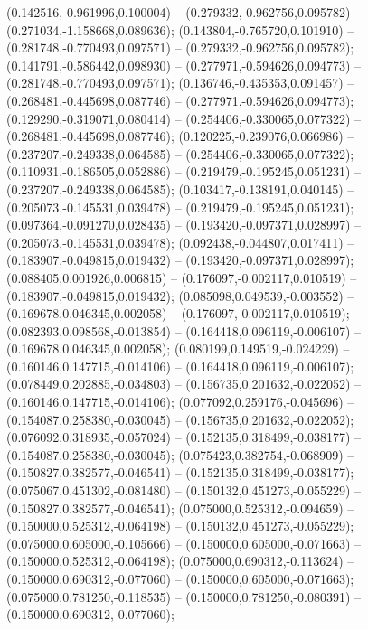  (0.142516,-0.961996,0.100004) -- (0.279332,-0.962756,0.095782) -- (0.271034,-1.158668,0.089636);
 (0.143804,-0.765720,0.101910) -- (0.281748,-0.770493,0.097571) -- (0.279332,-0.962756,0.095782);
 (0.141791,-0.586442,0.098930) -- (0.277971,-0.594626,0.094773) -- (0.281748,-0.770493,0.097571);
 (0.136746,-0.435353,0.091457) -- (0.268481,-0.445698,0.087746) -- (0.277971,-0.594626,0.094773);
 (0.129290,-0.319071,0.080414) -- (0.254406,-0.330065,0.077322) -- (0.268481,-0.445698,0.087746);
 (0.120225,-0.239076,0.066986) -- (0.237207,-0.249338,0.064585) -- (0.254406,-0.330065,0.077322);
 (0.110931,-0.186505,0.052886) -- (0.219479,-0.195245,0.051231) -- (0.237207,-0.249338,0.064585);
 (0.103417,-0.138191,0.040145) -- (0.205073,-0.145531,0.039478) -- (0.219479,-0.195245,0.051231);
 (0.097364,-0.091270,0.028435) -- (0.193420,-0.097371,0.028997) -- (0.205073,-0.145531,0.039478);
 (0.092438,-0.044807,0.017411) -- (0.183907,-0.049815,0.019432) -- (0.193420,-0.097371,0.028997);
 (0.088405,0.001926,0.006815) -- (0.176097,-0.002117,0.010519) -- (0.183907,-0.049815,0.019432);
 (0.085098,0.049539,-0.003552) -- (0.169678,0.046345,0.002058) -- (0.176097,-0.002117,0.010519);
 (0.082393,0.098568,-0.013854) -- (0.164418,0.096119,-0.006107) -- (0.169678,0.046345,0.002058);
 (0.080199,0.149519,-0.024229) -- (0.160146,0.147715,-0.014106) -- (0.164418,0.096119,-0.006107);
 (0.078449,0.202885,-0.034803) -- (0.156735,0.201632,-0.022052) -- (0.160146,0.147715,-0.014106);
 (0.077092,0.259176,-0.045696) -- (0.154087,0.258380,-0.030045) -- (0.156735,0.201632,-0.022052);
 (0.076092,0.318935,-0.057024) -- (0.152135,0.318499,-0.038177) -- (0.154087,0.258380,-0.030045);
 (0.075423,0.382754,-0.068909) -- (0.150827,0.382577,-0.046541) -- (0.152135,0.318499,-0.038177);
 (0.075067,0.451302,-0.081480) -- (0.150132,0.451273,-0.055229) -- (0.150827,0.382577,-0.046541);
 (0.075000,0.525312,-0.094659) -- (0.150000,0.525312,-0.064198) -- (0.150132,0.451273,-0.055229);
 (0.075000,0.605000,-0.105666) -- (0.150000,0.605000,-0.071663) -- (0.150000,0.525312,-0.064198);
 (0.075000,0.690312,-0.113624) -- (0.150000,0.690312,-0.077060) -- (0.150000,0.605000,-0.071663);
 (0.075000,0.781250,-0.118535) -- (0.150000,0.781250,-0.080391) -- (0.150000,0.690312,-0.077060);
